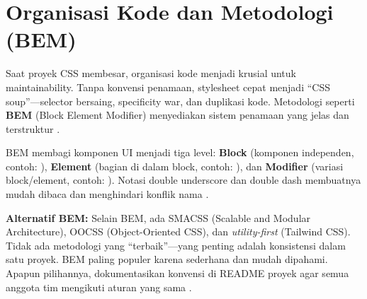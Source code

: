 \section{Organisasi Kode dan Metodologi (BEM)}

Saat proyek CSS membesar, organisasi kode menjadi krusial untuk maintainability. Tanpa konvensi penamaan, stylesheet cepat menjadi ``CSS soup''---selector bersaing, specificity war, dan duplikasi kode. Metodologi seperti \textbf{BEM} (Block Element Modifier) menyediakan sistem penamaan yang jelas dan terstruktur \cite{webdevCss}.

BEM membagi komponen UI menjadi tiga level: \textbf{Block} (komponen independen, contoh: ), \textbf{Element} (bagian di dalam block, contoh: ), dan \textbf{Modifier} (variasi block/element, contoh: ). Notasi double underscore dan double dash membuatnya mudah dibaca dan menghindari konflik nama \cite{mdnCss}.


\begin{catatan}
\textbf{Alternatif BEM:} Selain BEM, ada SMACSS (Scalable and Modular Architecture), OOCSS (Object-Oriented CSS), dan \textit{utility-first} (Tailwind CSS). Tidak ada metodologi yang ``terbaik''---yang penting adalah konsistensi dalam satu proyek. BEM paling populer karena sederhana dan mudah dipahami. Apapun pilihannya, dokumentasikan konvensi di README proyek agar semua anggota tim mengikuti aturan yang sama \cite{cssTricks}.
\end{catatan}


